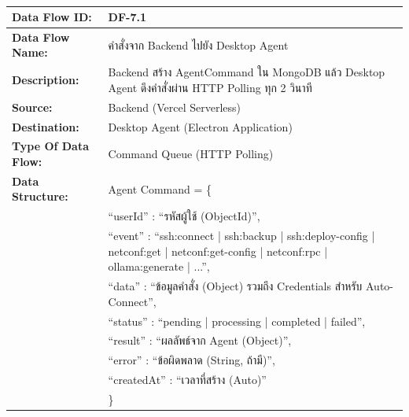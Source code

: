 \begin{table}[H]
    \caption{}
    \label{tab:df-7-1}
    \fontSixTeen 
    \begin{tabularx}{\textwidth}{|l|L|} 
        \hline
        \textbf{Data Flow ID:} & DF-7.1 \\
        \hline
        \textbf{Data Flow Name:} & คำสั่งจาก Backend ไปยัง Desktop Agent \\
        \hline
        \textbf{Description:} & Backend สร้าง AgentCommand ใน MongoDB แล้ว Desktop Agent ดึงคำสั่งผ่าน HTTP Polling ทุก 2 วินาที \\
        \hline
        \textbf{Source:} & Backend (Vercel Serverless) \\
        \hline
        \textbf{Destination:} & Desktop Agent (Electron Application) \\
        \hline
        \textbf{Type Of Data Flow:} & Command Queue (HTTP Polling) \\
        \hline
        \textbf{Data Structure:} & Agent Command = \{ \nonumber \\
                        & \hspace{1em} ``userId'' : ``รหัสผู้ใช้ (ObjectId)'', \nonumber \\
                        & \hspace{1em} ``event'' : ``ssh:connect | ssh:backup | ssh:deploy-config | netconf:get | netconf:get-config | netconf:rpc | ollama:generate | ...'', \nonumber \\
                        & \hspace{1em} ``data'' : ``ข้อมูลคำสั่ง (Object) รวมถึง Credentials สำหรับ Auto-Connect'', \nonumber \\
                        & \hspace{1em} ``status'' : ``pending | processing | completed | failed'', \nonumber \\
                        & \hspace{1em} ``result'' : ``ผลลัพธ์จาก Agent (Object)'', \nonumber \\
                        & \hspace{1em} ``error'' : ``ข้อผิดพลาด (String, ถ้ามี)'', \nonumber \\
                        & \hspace{1em} ``createdAt'' : ``เวลาที่สร้าง (Auto)'' \nonumber \\
                        & \} \\
        \hline
    \end{tabularx}
\end{table}

